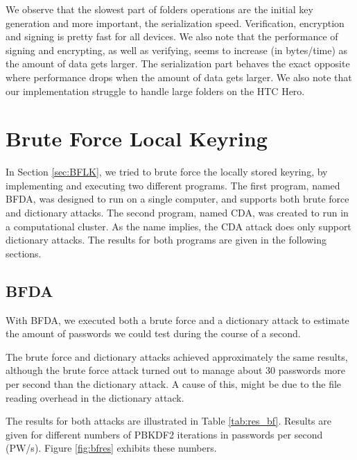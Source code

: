 \documentclass[pdftex,english,10pt,b5paper,twoside]{book}
\begin{document}
We observe that the slowest part of folders operations are the initial key
generation and more important, the serialization speed. Verification,
encryption and signing is pretty fast for all devices. We also note that the
performance of signing and encrypting, as well as verifying, seems to increase
(in bytes/time) as the amount of data gets larger. The serialization part
behaves the exact opposite where performance drops when the amount of data gets
larger. We also note that our implementation struggle to handle large folders
on the HTC Hero.

\section{Brute Force Local Keyring}
\label{sec:R:BFLK}
In Section \ref{sec:BFLK}, we tried to brute force the locally stored keyring,
by implementing and executing two different programs. The first program, named
\acf{BFDA}, was designed to run on a single computer, and supports both brute
force and dictionary attacks. The second program, named \acf{CDA}, was created
to run in a computational cluster. As the name implies, the \ac{CDA} attack
does only support dictionary attacks. The results for both programs are given
in the following sections.

\subsection{\acl{BFDA}}

With \ac{BFDA}, we executed both a brute force and a dictionary attack to
estimate the amount of passwords we could test during the course of a second.

The brute force and dictionary attacks achieved approximately the same results,
although the brute force attack turned out to manage about 30 passwords more
per second than the dictionary attack. A cause of this, might be due to the
file reading overhead in the dictionary attack. 

The results for both attacks are illustrated in Table \ref{tab:res_bf}. Results
are given for different numbers of \ac{PBKDF2} iterations in passwords per
second (PW/s). Figure \ref{fig:bfres} exhibits these numbers.


\end{document}
